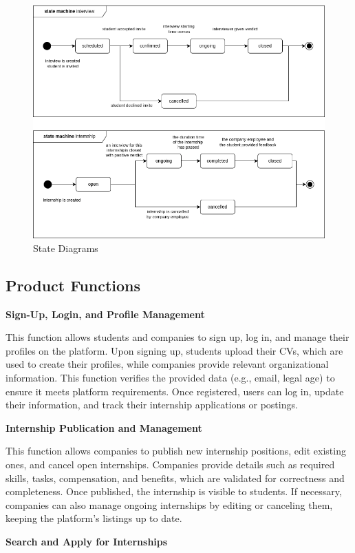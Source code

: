 \begin{figure}[H]
\centering
\includegraphics[width=\textwidth]{Images/state_diagrams.png}
\caption{\label{fig:state-diagrams} State Diagrams}
\end{figure}
\subsection{Product Functions}
\textbf{Sign-Up, Login, and Profile Management}

This function allows students and companies to sign up, log in, and manage their profiles on the platform. Upon signing up, students upload their CVs, which are used to create their profiles, while companies provide relevant organizational information. This function verifies the provided data (e.g., email, legal age) to ensure it meets platform requirements. Once registered, users can log in, update their information, and track their internship applications or postings.

\textbf{Internship Publication and Management}

This function allows companies to publish new internship positions, edit existing ones, and cancel open internships. Companies provide details such as required skills, tasks, compensation, and benefits, which are validated for correctness and completeness. Once published, the internship is visible to students. If necessary, companies can also manage ongoing internships by editing or canceling them, keeping the platform’s listings up to date.

\textbf{Search and Apply for Internships}

